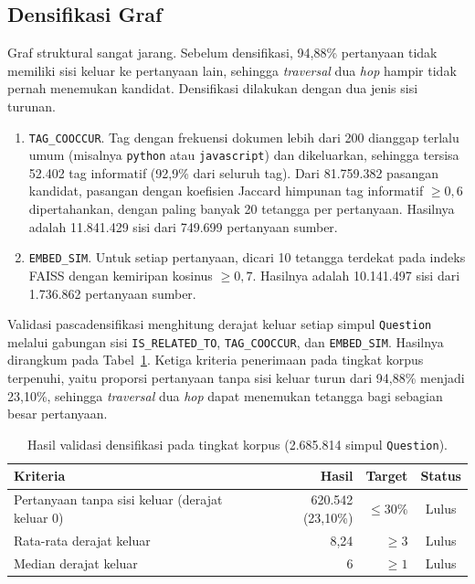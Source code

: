 \subsection{Densifikasi Graf}
\label{subsec:implementasi-densifikasi}

Graf struktural sangat jarang. Sebelum densifikasi, 94,88\% pertanyaan tidak memiliki sisi keluar ke pertanyaan lain, sehingga \emph{traversal} dua \emph{hop} hampir tidak pernah menemukan kandidat. Densifikasi dilakukan dengan dua jenis sisi turunan.
\begin{enumerate}
    \item \texttt{TAG\_COOCCUR}. Tag dengan frekuensi dokumen lebih dari 200 dianggap terlalu umum (misalnya \texttt{python} atau \texttt{javascript}) dan dikeluarkan, sehingga tersisa 52.402 tag informatif (92,9\% dari seluruh tag). Dari 81.759.382 pasangan kandidat, pasangan dengan koefisien Jaccard himpunan tag informatif $\geq 0{,}6$ dipertahankan, dengan paling banyak 20 tetangga per pertanyaan. Hasilnya adalah 11.841.429 sisi dari 749.699 pertanyaan sumber.
    \item \texttt{EMBED\_SIM}. Untuk setiap pertanyaan, dicari 10 tetangga terdekat pada indeks FAISS dengan kemiripan kosinus $\geq 0{,}7$. Hasilnya adalah 10.141.497 sisi dari 1.736.862 pertanyaan sumber.
\end{enumerate}
Validasi pascadensifikasi menghitung derajat keluar setiap simpul \texttt{Question} melalui gabungan sisi \texttt{IS\_RELATED\_TO}, \texttt{TAG\_COOCCUR}, dan \texttt{EMBED\_SIM}. Hasilnya dirangkum pada Tabel~\ref{tab:validasi-densifikasi}. Ketiga kriteria penerimaan pada tingkat korpus terpenuhi, yaitu proporsi pertanyaan tanpa sisi keluar turun dari 94,88\% menjadi 23,10\%, sehingga \emph{traversal} dua \emph{hop} dapat menemukan tetangga bagi sebagian besar pertanyaan.

\begin{table}[!htbp]
\centering
\small
\caption{Hasil validasi densifikasi pada tingkat korpus (2.685.814 simpul \texttt{Question}).}
\label{tab:validasi-densifikasi}
\renewcommand{\arraystretch}{1.2}
\begin{tabular}{|l|r|r|c|}
\hline
\textbf{Kriteria} & \textbf{Hasil} & \textbf{Target} & \textbf{Status} \\
\hline
Pertanyaan tanpa sisi keluar (derajat keluar 0) & 620.542 (23,10\%) & $\leq 30\%$ & Lulus \\
Rata-rata derajat keluar & 8,24 & $\geq 3$ & Lulus \\
Median derajat keluar & 6 & $\geq 1$ & Lulus \\
\hline
\end{tabular}
\end{table}


